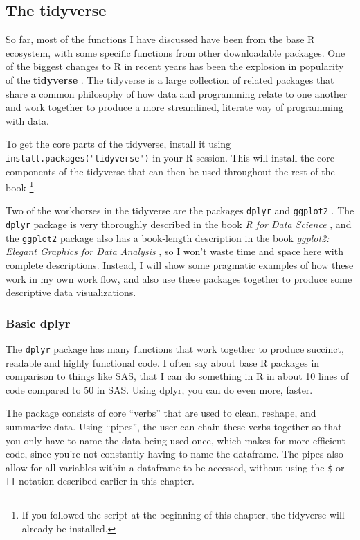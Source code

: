 \documentclass[
]{article}
\begin{document}
\hypertarget{the-tidyverse}{%
\subsection{The tidyverse}\label{the-tidyverse}}

So far, most of the functions I have discussed have been from the base R
ecosystem, with some specific functions from other downloadable
packages. One of the biggest changes to R in recent years has been the
explosion in popularity of the \textbf{tidyverse} \citet{tidyverse}. The tidyverse
is a large collection of related packages that share a common philosophy
of how data and programming relate to one another and work together to
produce a more streamlined, literate way of programming with data.

To get the core parts of the tidyverse, install it using
\texttt{install.packages("tidyverse")} in your R session. This will install the
core components of the tidyverse that can then be used throughout the
rest of the book \footnote{If you followed the script at the beginning of this
  chapter, the tidyverse will already be installed.}.

Two of the workhorses in the tidyverse are the packages \texttt{dplyr} \citet{dplyr}
and \texttt{ggplot2} \citet{ggplot2}. The \texttt{dplyr} package is very thoroughly described
in the book \emph{R for Data Science} \citet{Wickham2017R}, and the \texttt{ggplot2}
package also has a book-length description in the book \emph{ggplot2: Elegant
Graphics for Data Analysis} \citet{ggplot2}, so I won't waste time and space
here with complete descriptions. Instead, I will show some pragmatic
examples of how these work in my own work flow, and also use these
packages together to produce some descriptive data visualizations.

\hypertarget{basic-dplyr}{%
\subsubsection{Basic dplyr}\label{basic-dplyr}}

The \texttt{dplyr} package has many functions that work together to produce
succinct, readable and highly functional code. I often say about base R
packages in comparison to things like SAS, that I can do something in R
in about 10 lines of code compared to 50 in SAS. Using dplyr, you can do
even more, faster.

The package consists of core ``verbs'' that are used to clean, reshape,
and summarize data. Using ``pipes'', the user can chain these verbs
together so that you only have to name the data being used once, which
makes for more efficient code, since you're not constantly having to
name the dataframe. The pipes also allow for all variables within a
dataframe to be accessed, without using the \texttt{\$} or \texttt{{[}{]}} notation
described earlier in this chapter.
\end{document}
